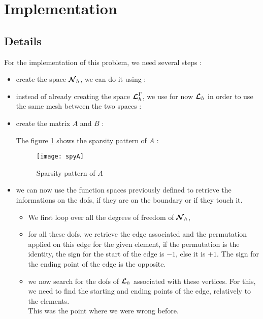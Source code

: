 \section{Implementation}
\subsection{Details}

For the implementation of this problem, we need several steps :
\begin{itemize}
\item
  create the space ${\bm{\mathcal{N}}}_h$, we can do it using :
  
\item
  instead of already creating the space ${\bm{\mathcal{L}}}_h^\Gamma$, we use for now ${\bm{\mathcal{L}}}_h$ in order to use the same mesh between the two spaces :
  
\item
  create the matrix $A$ and $B$ :
  
  The figure \ref{spyA} shows the sparsity pattern of $A$ : 
  \begin{figure}[H]
    \centering
    \texttt{[image: spyA]}
    \caption{Sparsity pattern of $A$}
    \label{spyA}
  \end{figure}
\item
  we can now use the function spaces previously defined to retrieve the
  informations on the dofs, if they are on the boundary or if they touch it.\\
  \begin{itemize}
  \item
    We first loop over all the degrees of freedom of ${\bm{\mathcal{N}}}_h$,
    
  \item
    for all these dofs, we retrieve the edge associated and the permutation applied on this edge for the given element, if the permutation is the identity, the sign for the start of the edge is $-1$, else it is $+1$. The sign for the ending point of the edge is the opposite.
    
  \item
    we now search for the dofs of ${\bm{\mathcal{L}}}_h$ associated with these vertices. For this, we need to find the starting and ending points of the edge, relatively to the elements.\\
    This was the point where we were wrong before.

\end{itemize}
\end{itemize}
